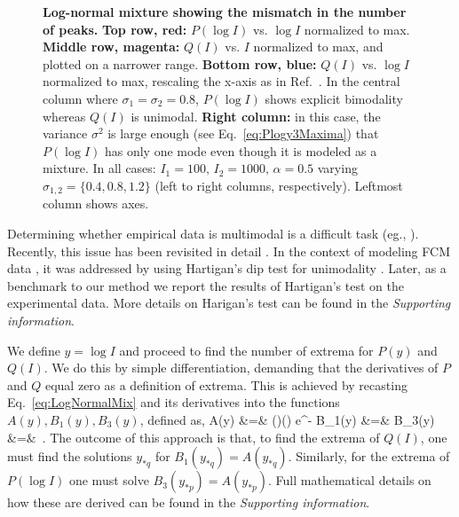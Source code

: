 \documentclass[11pt,a4paper,draft]{article}
\begin{document}
\begin{figure}[!ht]
 \centering
  \caption{\textbf{Log-normal mixture showing the mismatch in the number of peaks.} \textbf{Top row, red:} $P(\log I)$ vs. $\log I$ normalized to max. \textbf{Middle row, magenta:} $Q(I)$ vs. $I$ normalized to max, and plotted on a narrower range. \textbf{Bottom row, blue:} $Q(I)$ vs. $\log I$ normalized to max, rescaling the x-axis as in Ref.~\cite{Novo2008}. In the central column where $\sigma_1=\sigma_2=0.8$, $P(\log I)$ shows explicit bimodality whereas $Q(I)$ is unimodal. \textbf{Right column:} in this case, the variance $\sigma^2$ is large enough (see Eq.~\ref{eq:Plogy3Maxima}) that $P(\log I)$ has only one mode even though it is modeled as a mixture. In all cases: $I_1=100,\,I_2=1000,\,\alpha=0.5$ varying $\sigma_{1,2}=\{0.4,0.8,1.2\}$ (left to right columns, respectively). Leftmost column shows axes. }
  \label{fig:PlotsLinearLog}
\end{figure}

Determining whether empirical data is multimodal is a difficult task (eg., \cite{Silverman1981}). Recently, this issue has been revisited in detail \cite{Johnsson2017}. In the context of modeling FCM data \cite{Das2009}, it was addressed by using Hartigan's dip test for unimodality \cite{Hartigan1985}. Later, as a benchmark to our method we report the results of Hartigan's test on the experimental data. More details on Harigan's test can be found in the \emph{Supporting information}.
\smallskip

We define $y=\log I$ and proceed to find the number of extrema for $P(y)$ and $Q(I)$. We do this by simple differentiation, demanding that the derivatives of $P$ and $Q$ equal zero as a definition of extrema. This is achieved by recasting Eq.~\ref{eq:LogNormalMix} and its derivatives into the functions $A(y),B_1(y),B_3(y)$, defined as,
\bea 
\label{eq:extrema}
A(y) &=& \left(\right)\left(\right) e^{-}  \nn
B_1(y) &=&  \nn
B_3(y) &=& \,.
\eea
The outcome of this approach is that, to find the extrema of $Q(I)$, one must find the solutions $y_{*q}$ for $B_1(y_{*q})=A(y_{*q})$. Similarly, for the extrema of $P(\log I)$ one must solve $B_3(y_{*p})=A(y_{*p})$. Full mathematical details on how these are derived can be found in the \emph{Supporting information}. 
\end{document}
